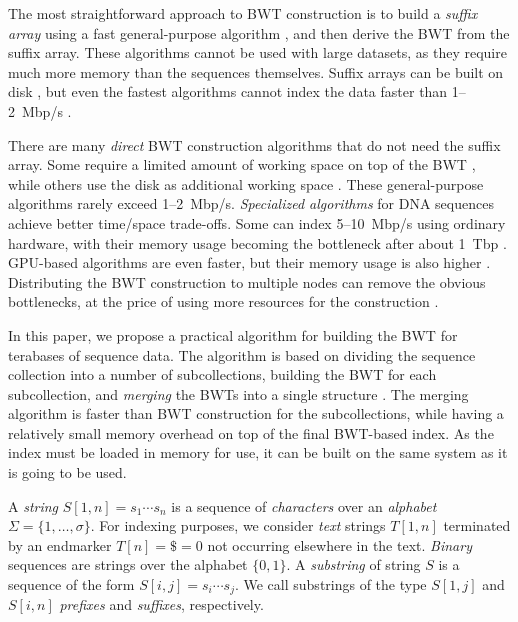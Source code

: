\documentclass[smallabstract,smallcaptions]{dccpaper}
\newcommand{\set}[1]{\ensuremath{\{ #1 \}}}
\newcommand{\BWT}{\textsf{BWT}}
\begin{document}
The most straightforward approach to \BWT{} construction is to build a \emph{suffix array} using a fast general-purpose algorithm \cite{Mori2008,Nong2011}, and then derive the \BWT{} from the suffix array. These algorithms cannot be used with large datasets, as they require much more memory than the sequences themselves. Suffix arrays can be built on disk \cite{Gonnet1992}, but even the fastest algorithms cannot index the data faster than 1\nobreakdash--2~Mbp/s
\cite{Kaerkkaeinen2015a}.

There are many \emph{direct} \BWT{} construction algorithms that do not need the suffix array. Some require a limited amount of working space on top of the \BWT{} \cite{Hon2007,Kaerkkaeinen2007,Siren2009,Okanohara2009}, while others use the disk as additional working space \cite{Ferragina2012,Beller2013}. These general-purpose algorithms rarely exceed 1\nobreakdash--2~Mbp/s. \emph{Specialized algorithms} for DNA sequences achieve better time/space trade-offs. Some can index 5\nobreakdash--10~Mbp/s using ordinary hardware, with their memory usage becoming the bottleneck after about 1~Tbp \cite{Bauer2013,Li2014a}. GPU-based algorithms are even faster, but their memory usage is also higher \cite{Liu2014,Pantaleoni2014}. Distributing the \BWT{} construction to multiple nodes can remove the obvious bottlenecks, at the price of using more resources for the construction \cite{Wang2015}.

In this paper, we propose a practical algorithm for building the \BWT{} for terabases of sequence data. The algorithm is based on dividing the sequence collection into a number of subcollections, building the \BWT{} for each subcollection, and \emph{merging} the \BWT{}s into a single structure \cite{Siren2009}. The merging algorithm is faster than \BWT{} construction for the subcollections, while having a relatively small memory overhead on top of the final \BWT-based index. As the index must be loaded in memory for use, it can be built on the same system as it is going to be used.



A \emph{string} $S[1,n] = s_{1} \dotsm s_{n}$ is a sequence of \emph{characters} over an \emph{alphabet} $\Sigma = \set{1, \dotsc, \sigma}$. For indexing purposes, we consider \emph{text} strings $T[1,n]$ terminated by an endmarker $T[n] = \$ = 0$ not occurring elsewhere in the text. \emph{Binary} sequences are strings over the alphabet $\set{0, 1}$. A \emph{substring} of string $S$ is a sequence of the form $S[i,j] = s_{i} \dotsm s_{j}$. We call substrings of the type $S[1,j]$ and $S[i,n]$ \emph{prefixes} and \emph{suffixes}, respectively.
\end{document}
